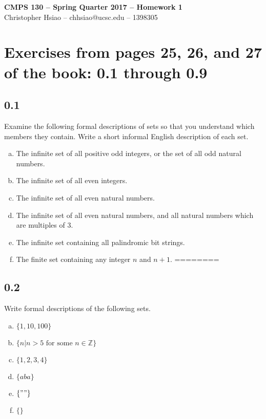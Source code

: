\documentclass[11pt]{article}
\begin{document}
\begin{center}
{\bf\Large CMPS 130 -- Spring Quarter 2017 --  Homework 1}\\
Christopher Hsiao -- chhsiao@ucsc.edu -- 1398305\\
\end{center}



\section{Exercises from pages 25, 26, and 27 of the book: 0.1 through 0.9}
\subsection*{0.1} 
Examine the following formal descriptions of sets so that you understand which members they contain. Write a short informal English description of each set.

\begin{enumerate}[a.]
\item The infinite set of all positive odd integers, or the set of all odd natural numbers.
\item The infinite set of all even integers.
\item The infinite set of all even natural numbers.
\item The infinite set of all even natural numbers, and all natural numbers which are multiples of 3.
\item The infinite set containing all palindromic bit strings.
\item The finite set containing any integer $n$ and $n+1$. ========
\end{enumerate}

\subsection*{0.2}
Write formal descriptions of the following sets.

\begin{enumerate}[a.]
\item $\{1, 10, 100\}$
\item $\{n | n > 5 \text{ for some } n \in \mathbb{Z}\}$
\item $\{1, 2, 3, 4\}$
\item $\{aba\}$
\item $\{""\}$
\item $\{ \}$
\end{enumerate}
\end{document}
